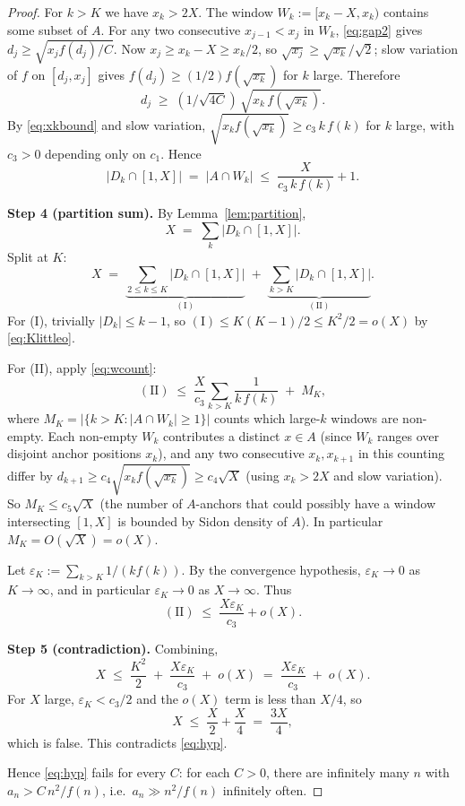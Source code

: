\documentclass[11pt]{article}
\begin{document}
\begin{proof}
For $k > K$ we have $x_k > 2X$. The window $W_k := [x_k - X, x_k)$ contains
some subset of $A$. For any two consecutive $x_{j-1} < x_j$ in $W_k$,
\eqref{eq:gap2} gives $d_j \geq \sqrt{x_j f(d_j)/C}$. Now $x_j \geq x_k - X
\geq x_k/2$, so $\sqrt{x_j} \geq \sqrt{x_k}/\sqrt{2}$; slow variation of
$f$ on $[d_j, x_j]$ gives $f(d_j) \geq (1/2) f(\sqrt{x_k})$ for $k$ large.
Therefore
\[
   d_j \;\geq\; (1/\sqrt{4C})\, \sqrt{x_k\, f(\sqrt{x_k})}.
\]
By \eqref{eq:xkbound} and slow variation, $\sqrt{x_k f(\sqrt{x_k})}
\geq c_3\, k\, f(k)$ for $k$ large, with $c_3 > 0$ depending only on $c_1$.
Hence
\begin{equation}\label{eq:wcount}
   |D_k \cap [1, X]| \;=\; |A \cap W_k|
   \;\leq\; \frac{X}{c_3\, k\, f(k)} + 1.
\end{equation}

\medskip
\noindent \textbf{Step 4 (partition sum).}
By Lemma~\ref{lem:partition},
\[
   X \;=\; \sum_k |D_k \cap [1, X]|.
\]
Split at $K$:
\[
   X \;=\; \underbrace{\sum_{2 \leq k \leq K} |D_k \cap [1, X]|}_{\mathrm{(I)}}
       \;+\; \underbrace{\sum_{k > K} |D_k \cap [1, X]|}_{\mathrm{(II)}}.
\]
For (I), trivially $|D_k| \leq k - 1$, so
$(\mathrm{I}) \leq K(K-1)/2 \leq K^2/2 = o(X)$ by \eqref{eq:Klittleo}.

For (II), apply \eqref{eq:wcount}:
\[
   (\mathrm{II}) \;\leq\; \frac{X}{c_3} \sum_{k > K} \frac{1}{k\, f(k)}
                   \;+\; M_K,
\]
where $M_K = |\{k > K : |A \cap W_k| \geq 1\}|$ counts which large-$k$
windows are non-empty. Each non-empty $W_k$ contributes a distinct
$x \in A$ (since $W_k$ ranges over disjoint anchor positions $x_k$),
and any two consecutive $x_k, x_{k+1}$ in this counting differ by
$d_{k+1} \geq c_4 \sqrt{x_k f(\sqrt{x_k})} \geq c_4 \sqrt X$ (using
$x_k > 2X$ and slow variation). So $M_K \leq c_5 \sqrt{X}$ (the number
of $A$-anchors that could possibly have a window intersecting $[1, X]$
is bounded by Sidon density of $A$). In particular $M_K = O(\sqrt X) = o(X)$.

Let $\varepsilon_K := \sum_{k > K} 1/(k f(k))$. By the convergence
hypothesis, $\varepsilon_K \to 0$ as $K \to \infty$, and in particular
$\varepsilon_K \to 0$ as $X \to \infty$. Thus
\[
   (\mathrm{II}) \;\leq\; \frac{X \varepsilon_K}{c_3} + o(X).
\]

\medskip
\noindent \textbf{Step 5 (contradiction).}
Combining,
\[
   X \;\leq\; \frac{K^2}{2} \;+\; \frac{X \varepsilon_K}{c_3} \;+\; o(X)
     \;=\; \frac{X \varepsilon_K}{c_3} \;+\; o(X).
\]
For $X$ large, $\varepsilon_K < c_3/2$ and the $o(X)$ term is less than
$X/4$, so
\[
   X \;\leq\; \frac{X}{2} + \frac{X}{4} \;=\; \frac{3X}{4},
\]
which is false. This contradicts \eqref{eq:hyp}.

Hence \eqref{eq:hyp} fails for every $C$: for each $C > 0$, there are
infinitely many $n$ with $a_n > C\, n^2/f(n)$, i.e.\ $a_n \gg n^2/f(n)$
infinitely often.
\end{proof}
\end{document}
